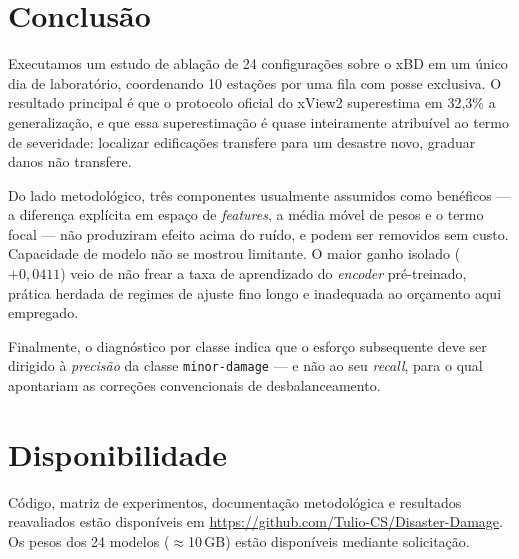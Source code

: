 \documentclass[11pt,a4paper]{article}
\begin{document}
\section{Conclusão}

Executamos um estudo de ablação de 24 configurações sobre o xBD em um único dia
de laboratório, coordenando 10 estações por uma fila com posse exclusiva. O
resultado principal é que o protocolo oficial do xView2 superestima em 32{,}3\% a
generalização, e que essa superestimação é quase inteiramente atribuível ao termo
de severidade: localizar edificações transfere para um desastre novo, graduar
danos não transfere.

Do lado metodológico, três componentes usualmente assumidos como benéficos ---
a diferença explícita em espaço de \emph{features}, a média móvel de pesos e o
termo focal --- não produziram efeito acima do ruído, e podem ser removidos sem
custo. Capacidade de modelo não se mostrou limitante. O maior ganho isolado
($+0{,}0411$) veio de não frear a taxa de aprendizado do \emph{encoder}
pré-treinado, prática herdada de regimes de ajuste fino longo e inadequada ao
orçamento aqui empregado.

Finalmente, o diagnóstico por classe indica que o esforço subsequente deve ser
dirigido à \emph{precisão} da classe \texttt{minor-damage} --- e não ao seu
\emph{recall}, para o qual apontariam as correções convencionais de
desbalanceamento.

\section*{Disponibilidade}

Código, matriz de experimentos, documentação metodológica e resultados
reavaliados estão disponíveis em
\url{https://github.com/Tulio-CS/Disaster-Damage}. Os pesos dos 24 modelos
($\approx$10\,GB) estão disponíveis mediante solicitação.
\end{document}
